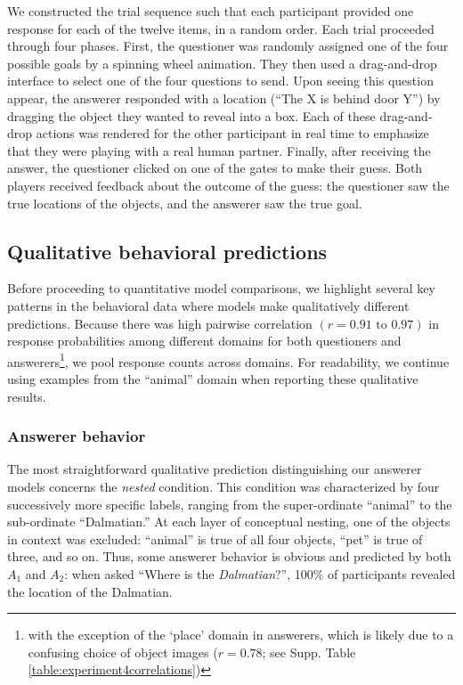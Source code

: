 \documentclass[12pt, floatsintext, jou]{apa6}
\begin{document}
We constructed the trial sequence such that each participant provided one response for each of the twelve items, in a random order.
Each trial proceeded through four phases. 
First, the questioner was randomly assigned one of the four possible goals by a spinning wheel animation.
They then used a drag-and-drop interface to select one of the four questions to send.
Upon seeing this question appear, the answerer responded with a location (``The X is behind door Y'') by dragging the object they wanted to reveal into a box. 
Each of these drag-and-drop actions was rendered for the other participant in real time to emphasize that they were playing with a real human partner.
Finally, after receiving the answer, the questioner clicked on one of the gates to make their guess. 
Both players received feedback about the outcome of the guess: the questioner saw the true locations of the objects, and the answerer saw the true goal. 

\subsection{Qualitative behavioral predictions}

Before proceeding to quantitative model comparisons, we highlight several key patterns in the behavioral data where models make qualitatively different predictions. 
Because there was high pairwise correlation $(r = 0.91 \textrm{ to } 0.97)$ in response probabilities among different domains for both questioners and answerers\footnote{with the exception of the `place' domain in answerers, which is likely due to a confusing choice of object images ($r = 0.78$; see Supp. Table \ref{table:experiment4correlations})}, we pool response counts across domains.
For readability, we continue using examples from the ``animal'' domain when reporting these qualitative results.

\subsubsection{Answerer behavior}
The most straightforward qualitative prediction distinguishing our answerer models concerns the \emph{nested} condition. 
This condition was characterized by four successively more specific labels, ranging from the super-ordinate ``animal'' to the sub-ordinate ``Dalmatian.'' 
At each layer of conceptual nesting, one of the objects in context was excluded: ``animal'' is true of all four objects, ``pet'' is true of three, and so on.
Thus, some answerer behavior is obvious and predicted by both $A_1$ and $A_2$: when asked ``Where is the \emph{Dalmatian}?'', 100\% of participants revealed the location of the Dalmatian.
\end{document}
